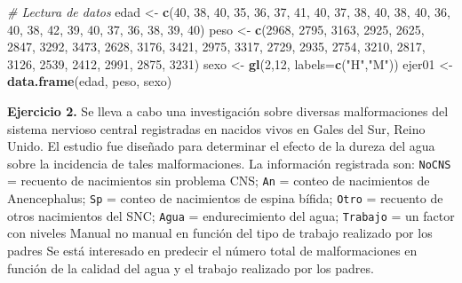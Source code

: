 \documentclass[
]{book}
\newenvironment{Shaded}{\begin{snugshade}}{\end{snugshade}}
\newcommand{\CommentTok}[1]{\textcolor[rgb]{0.56,0.35,0.01}{\textit{#1}}}
\newcommand{\DataTypeTok}[1]{\textcolor[rgb]{0.13,0.29,0.53}{#1}}
\newcommand{\DecValTok}[1]{\textcolor[rgb]{0.00,0.00,0.81}{#1}}
\newcommand{\KeywordTok}[1]{\textcolor[rgb]{0.13,0.29,0.53}{\textbf{#1}}}
\newcommand{\NormalTok}[1]{#1}
\newcommand{\StringTok}[1]{\textcolor[rgb]{0.31,0.60,0.02}{#1}}
\theoremstyle{definition}
\theoremstyle{definition}
\theoremstyle{definition}
\theoremstyle{remark}
\begin{document}
\begin{Shaded}
\begin{Highlighting}[]
\CommentTok{# Lectura de datos}
\NormalTok{edad <-}\StringTok{ }\KeywordTok{c}\NormalTok{(}\DecValTok{40}\NormalTok{, }\DecValTok{38}\NormalTok{, }\DecValTok{40}\NormalTok{, }\DecValTok{35}\NormalTok{, }\DecValTok{36}\NormalTok{, }\DecValTok{37}\NormalTok{, }\DecValTok{41}\NormalTok{, }\DecValTok{40}\NormalTok{, }\DecValTok{37}\NormalTok{, }\DecValTok{38}\NormalTok{, }\DecValTok{40}\NormalTok{, }\DecValTok{38}\NormalTok{,}
          \DecValTok{40}\NormalTok{, }\DecValTok{36}\NormalTok{, }\DecValTok{40}\NormalTok{, }\DecValTok{38}\NormalTok{, }\DecValTok{42}\NormalTok{, }\DecValTok{39}\NormalTok{, }\DecValTok{40}\NormalTok{, }\DecValTok{37}\NormalTok{, }\DecValTok{36}\NormalTok{, }\DecValTok{38}\NormalTok{, }\DecValTok{39}\NormalTok{, }\DecValTok{40}\NormalTok{)}
\NormalTok{peso <-}\StringTok{ }\KeywordTok{c}\NormalTok{(}\DecValTok{2968}\NormalTok{, }\DecValTok{2795}\NormalTok{, }\DecValTok{3163}\NormalTok{, }\DecValTok{2925}\NormalTok{, }\DecValTok{2625}\NormalTok{, }\DecValTok{2847}\NormalTok{, }\DecValTok{3292}\NormalTok{, }\DecValTok{3473}\NormalTok{, }\DecValTok{2628}\NormalTok{, }\DecValTok{3176}\NormalTok{,}
          \DecValTok{3421}\NormalTok{, }\DecValTok{2975}\NormalTok{, }\DecValTok{3317}\NormalTok{, }\DecValTok{2729}\NormalTok{, }\DecValTok{2935}\NormalTok{, }\DecValTok{2754}\NormalTok{, }\DecValTok{3210}\NormalTok{, }\DecValTok{2817}\NormalTok{, }\DecValTok{3126}\NormalTok{, }\DecValTok{2539}\NormalTok{,}
          \DecValTok{2412}\NormalTok{, }\DecValTok{2991}\NormalTok{, }\DecValTok{2875}\NormalTok{, }\DecValTok{3231}\NormalTok{)}
\NormalTok{sexo <-}\StringTok{ }\KeywordTok{gl}\NormalTok{(}\DecValTok{2}\NormalTok{,}\DecValTok{12}\NormalTok{, }\DataTypeTok{labels=}\KeywordTok{c}\NormalTok{(}\StringTok{"H"}\NormalTok{,}\StringTok{"M"}\NormalTok{))}
\NormalTok{ejer01 <-}\StringTok{ }\KeywordTok{data.frame}\NormalTok{(edad, peso, sexo)}
\end{Highlighting}
\end{Shaded}

\textbf{Ejercicio 2.} Se lleva a cabo una investigación sobre diversas malformaciones del sistema nervioso central registradas en nacidos vivos en Gales del Sur, Reino Unido. El estudio fue diseñado para determinar el efecto de la dureza del agua sobre la incidencia de tales malformaciones. La información registrada son: \texttt{NoCNS} = recuento de nacimientos sin problema CNS; \texttt{An} = conteo de nacimientos de Anencephalus; \texttt{Sp} = conteo de nacimientos de espina bífida; \texttt{Otro} = recuento de otros nacimientos del SNC; \texttt{Agua} = endurecimiento del agua; \texttt{Trabajo} = un factor con niveles Manual no manual en función del tipo de trabajo realizado por los padres Se está interesado en predecir el número total de malformaciones en función de la calidad del agua y el trabajo realizado por los padres.
\end{document}
